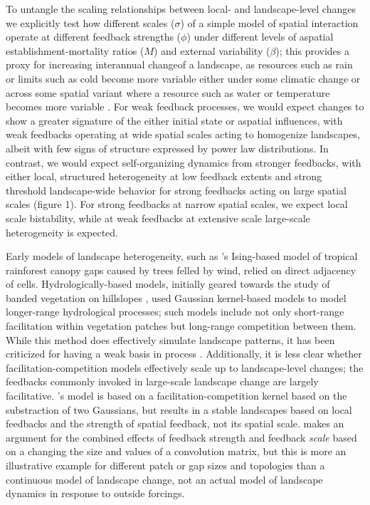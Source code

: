 \documentclass[10pt]{article}
\begin{document}
\begin{linenumbers}
To untangle the scaling relationships between local- and landscape-level changes we explicitly test how different scales ($\sigma$) of a simple model of spatial interaction operate at different feedback strengths ($\phi$) under different levels of aspatial establishment-mortality ratios ($M$) and external variability ($\beta$); this provides a proxy for increasing interannual changeof a landscape, as resources such as rain or limits such as cold become more variable either under some climatic change or across some spatial variant where a resource such as water or temperature becomes more variable \citep{DOdorico2013}. For weak feedback processes, we would expect changes to show a greater signature of the either initial state or aspatial influences, with weak feedbacks operating at wide spatial scales acting to homogenize landscapes, albeit with few signs of structure expressed by power law distributions. In contrast, we would expect self-organizing dynamics from stronger feedbacks, with either local, structured heterogeneity at low feedback extents and strong threshold landscape-wide behavior for strong feedbacks acting on large spatial scales (figure 1). For strong feedbacks at narrow spatial scales, we expect local scale bistability, while at weak feedbacks at extensive scale large-scale heterogeneity is expected.

Early models of landscape heterogeneity, such as \citep{Katori1998}'s Ising-based model of tropical rainforest canopy gaps caused by trees felled by wind, relied on direct adjacency of cells. Hydrologically-based models, initially geared towards the study of banded vegetation on hillslopes \citep{Lefever1997}, used Gaussian kernel-based models to model longer-range hydrological processes; such models include not only short-range facilitation within vegetation patches but long-range competition between them. While this method does effectively simulate landscape patterns, it has been criticized for having a weak basis in process \citep{Stewart}. Additionally, it is less clear whether facilitation-competition models effectively scale up to landscape-level changes; the feedbacks commonly invoked in large-scale landscape change are largely facilitative. \citet{DOdorico2006}'s model is based on a facilitation-competition kernel based on the substraction of two Gaussians, but results in a stable landscapes based on local feedbacks and the strength of spatial feedback, not its spatial scale. \citet{Rietkerk2004} makes an argument for the combined effects of feedback strength and feedback \textit{scale} based on a changing the size and values of a convolution matrix, but this is more an illustrative example for different patch or gap sizes and topologies than a continuous model of landscape change, not an actual model of landscape dynamics in response to outside forcings.





\end{linenumbers}
\end{document}
